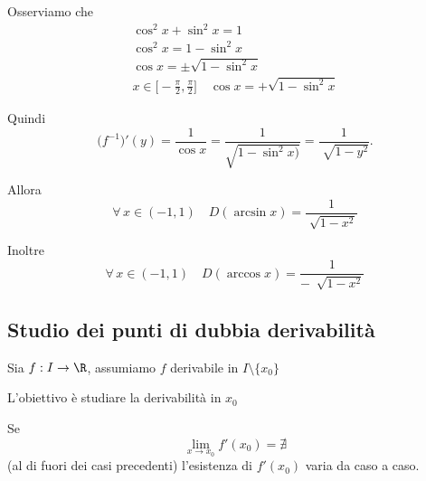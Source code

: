 Osserviamo che \begin{gather*}
    \cos^{2}x + \sin^{2}x =1\\
    \cos^{2}x =1- \sin^{2}x\\
    \cos x =\pm \sqrt{1- \sin^{2}x}\\
    x \in \biggl[-\frac{\pi}{2},\frac{\pi}{2}\biggr]\quad \cos x =+\sqrt{1- \sin^{2}x}
\end{gather*}

Quindi
\[
    \bigl(f^{-1}\bigr)'(y)=\frac{1}{\cos x}=\frac{1}{\sqrt{1- \sin^{2}x )}}=\frac{1}{\sqrt[]{1-y^{2}}}.
\] 

Allora \begin{equation}
    \forall\,x \in (-1, 1)\quad D(\arcsin x)=\frac{1}{\sqrt[]{1-x^{2}}}
\end{equation}

Inoltre \begin{equation}
    \forall\,x \in (-1, 1)\quad D(\arccos x)=\frac{1}{-\:\sqrt[]{1-x^{2}}}
\end{equation}

\subsection{Studio dei punti di dubbia derivabilità}

Sia $ f:I\to \R $, assumiamo $ f $ derivabile in $ I\setminus \{x_0\} $

L'obiettivo è studiare la derivabilità in $ x_0 $

Se \[
    \lim_{x\to x_0} f'(x_0) = \nexists
\] (al di fuori dei casi precedenti) l'esistenza di $ f'(x_0) $ varia da caso a caso.

